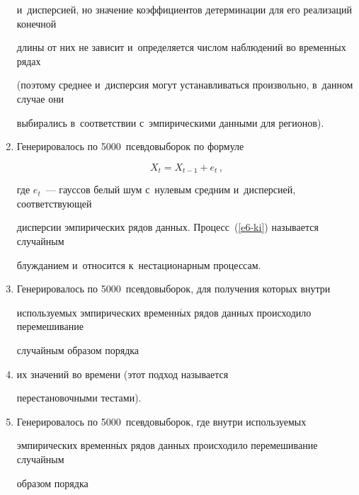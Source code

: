 \begin{multicols}{2}
\begin{enumerate}[1.]
и~дисперсией, но значение коэффициентов детерминации для его реализаций конечной 


длины от них не зависит и~определяется числом наблюдений во временн$\acute{\mbox{ы}}$х рядах 


(поэтому среднее и~дисперсия могут устанавливаться произвольно, в~данном случае они 


выбирались в~соответствии с~эмпирическими данными для регионов).


  


  \item Генерировалось по 5000~псевдовыборок по формуле


  \begin{equation}X_t=X_{t-1}+e_t\,,


  \label{e6-ki}


  \end{equation}


  где $e_t$~--- гауссов белый шум с~нулевым средним и~дисперсией, соответствующей 


дисперсии эмпирических рядов данных. Процесс~(\ref{e6-ki}) называется случайным 


блужданием и~относится к~нестационарным процессам.


  \item Генерировалось по 5000~псевдовыборок, для получения которых внутри 


используемых эмпирических временн$\acute{\mbox{ы}}$х рядов данных происходило перемешивание 


случайным образом порядка\linebreak\vspace*{-12pt}





\pagebreak





\item[ ] их значений во времени (этот подход называется 


перестановочными тестами).\\[-8pt]


  \item Генерировалось по 5000~псевдовыборок, где внутри используемых 


эмпирических временн$\acute{\mbox{ы}}$х рядов данных происходило перемешивание случайным 


образом порядка



\end{enumerate}
\end{multicols}

